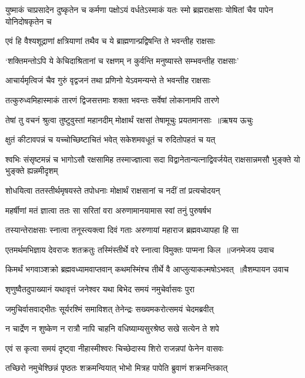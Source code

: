 \threelineshloka
{युष्माकं चाप्रसादेन दुष्कृतेन च कर्मणा}
{पक्षोऽयं वर्धतेऽस्माकं यतः स्मो ब्रह्मराक्षसाः}
{योषितां चैव पापेन योनिदोषकृतेन च}


\twolineshloka
{एवं हि वैश्यशूद्राणां क्षत्रियाणां तथैव च}
{ये ब्राह्मणान्प्रद्विषन्ति ते भवन्तीह राक्षसाः}


\twolineshloka
{`शक्तिमन्तोऽपि ये केचिदाश्रितानां च रक्षणम्}
{न कुर्वन्ति मनुष्यास्ते सम्भवन्तीह राक्षसाः'}


\twolineshloka
{आचार्यमृत्विजं चैव गुरुं वृद्वजनं तथा}
{प्रणिनो येऽवमन्यन्ते ते भवन्तीह राक्षसाः}


\twolineshloka
{तत्कुरुध्वमिहास्माकं तारणं द्विजसत्तमाः}
{शक्ता भवन्तः सर्वेषां लोकानामपि तारणे}


\threelineshloka
{तेषां तु वचनं श्रुत्वा तुष्टुवुस्तां महानदीम्}
{मोक्षार्थं रक्षसां तेषामूचुः प्रयतमानसाः ॥ऋषय ऊचुः}
{}


\twolineshloka
{क्षुतं कीटावपन्नं च यच्चोच्छिष्टाचितं भवेत्}
{सकेशमवधूतं च रुदितोपहतं च यत्}


\threelineshloka
{श्वभिः संसृष्टमन्नं च भागोऽसौ रक्षसामिह}
{तस्माज्ज्ञात्वा सदा विद्वानेतान्यत्नाद्विवर्जयेत्}
{राक्षसान्नमसौ भुङ्क्ते यो भुङ्क्ते ह्यन्नमीदृशम्}


\twolineshloka
{शोधयित्वा ततस्तीर्थमृषयस्ते तपोधनाः}
{मोक्षार्थं राक्षसानां च नदीं तां प्रत्यचोदयन्}


\twolineshloka
{महर्षीणां मतं ज्ञात्वा ततः सा सरितां वरा}
{अरुणामानयामास स्वां तनुं पुरुषर्षभ}


\twolineshloka
{तस्यान्तेराक्षसाः स्नात्वा तनूस्त्यक्त्वा दिवं गताः}
{अरुणायां महाराज ब्रह्मवध्यापहा हि सा}


\threelineshloka
{एतमर्थमभिज्ञाय देवराजः शतक्रतुः}
{तस्मिंस्तीर्थे वरे स्नात्वा विमुक्तः पाप्मना किल ॥जनमेजय उवाच}
{}


\threelineshloka
{किमर्थं भगवाञ्शक्रो ब्रह्मवध्यामवाप्तवान्}
{कथमस्मिंश्च तीर्थे वै आप्लुत्याकल्मषोऽभवत् ॥वैशम्पायन उवाच}
{}


\twolineshloka
{शृणुष्वैतदुपाख्यानं यथावृत्तं जनेश्वर}
{यथा बिभेद समयं नमुचेर्वासवः पुरा}


\twolineshloka
{जमुचिर्वासवाद्भीतः सूर्यरश्मिं समाविशत्}
{तेनेन्द्रः सख्यमकरोत्समयं चेदमब्रवीत्}


\twolineshloka
{न चार्द्रेण न शुष्केण न रात्रौ नापि चाहनि}
{वधिष्याम्यसुरश्रेष्ठ सखे सत्येन ते शपे}


\twolineshloka
{एवं स कृत्वा समयं दृष्ट्वा नीहास्मीश्वरः}
{चिच्छेदास्य शिरो राजन्नपां फेनेन वासवः}


\twolineshloka
{तच्छिरो नमुचेश्छिन्नं पृष्ठतः शक्रमन्वियात्}
{भोभो मित्रह पापेति ब्रुवाणं शक्रमन्तिकात्}


